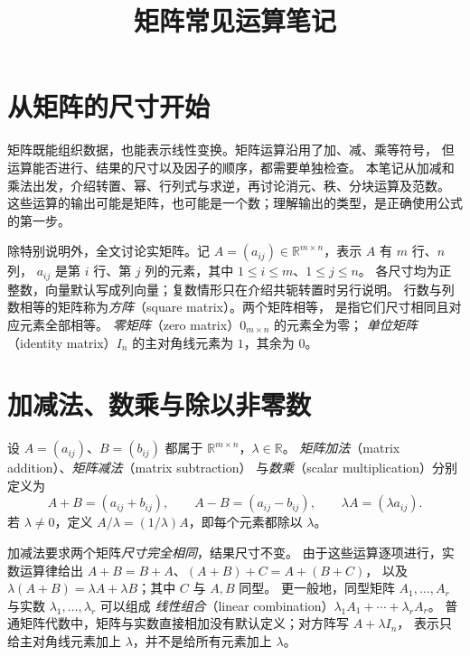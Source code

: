 \documentclass[UTF8,12pt,a4paper,fontset=fandol]{ctexart}
\title{矩阵常见运算笔记}
\author{}
\date{}
\begin{document}
\maketitle

\section{从矩阵的尺寸开始}

矩阵既能组织数据，也能表示线性变换。矩阵运算沿用了加、减、乘等符号，
但运算能否进行、结果的尺寸以及因子的顺序，都需要单独检查。
本笔记从加减和乘法出发，介绍转置、幂、行列式与求逆，再讨论消元、秩、分块运算及范数。
这些运算的输出可能是矩阵，也可能是一个数；理解输出的类型，是正确使用公式的第一步。

除特别说明外，全文讨论实矩阵。记 $A=(a_{ij})\in\mathbb R^{m\times n}$，表示 $A$ 有 $m$ 行、$n$ 列，
$a_{ij}$ 是第 $i$ 行、第 $j$ 列的元素，其中 $1\le i\le m$、$1\le j\le n$。
各尺寸均为正整数，向量默认写成列向量；复数情形只在介绍共轭转置时另行说明。
行数与列数相等的矩阵称为\emph{方阵}（square matrix）。两个矩阵相等，
是指它们尺寸相同且对应元素全部相等。
\emph{零矩阵}（zero matrix）$0_{m\times n}$ 的元素全为零；
\emph{单位矩阵}（identity matrix）$I_n$ 的主对角线元素为 $1$，其余为 $0$。

\section{加减法、数乘与除以非零数}

\begin{definition}[逐项线性运算]
设 $A=(a_{ij})$、$B=(b_{ij})$ 都属于 $\mathbb R^{m\times n}$，$\lambda\in\mathbb R$。
\emph{矩阵加法}（matrix addition）、\emph{矩阵减法}（matrix subtraction）
与\emph{数乘}（scalar multiplication）分别定义为
\[
  A+B=(a_{ij}+b_{ij}),\qquad A-B=(a_{ij}-b_{ij}),\qquad
  \lambda A=(\lambda a_{ij}).
\]
若 $\lambda\ne0$，定义 $A/\lambda=(1/\lambda)A$，即每个元素都除以 $\lambda$。
\end{definition}

加减法要求两个矩阵\emph{尺寸完全相同}，结果尺寸不变。
由于这些运算逐项进行，实数运算律给出 $A+B=B+A$、$(A+B)+C=A+(B+C)$，
以及 $\lambda(A+B)=\lambda A+\lambda B$；其中 $C$ 与 $A,B$ 同型。
更一般地，同型矩阵 $A_1,\ldots,A_r$ 与实数 $\lambda_1,\ldots,\lambda_r$ 可以组成
\emph{线性组合}（linear combination）$\lambda_1A_1+\cdots+\lambda_rA_r$。
普通矩阵代数中，矩阵与实数直接相加没有默认定义；对方阵写 $A+\lambda I_n$，
表示只给主对角线元素加上 $\lambda$，并不是给所有元素加上 $\lambda$。
\end{document}
